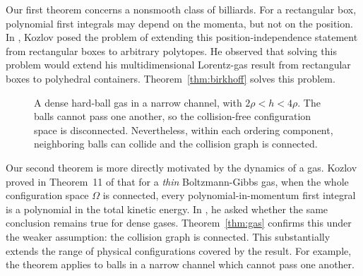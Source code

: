 \documentclass[12pt,reqno]{amsart}
\numberwithin{equation}{section}
\begin{document}
Our first theorem concerns a nonsmooth class of billiards. For a rectangular
box, polynomial first integrals may depend on
the momenta, but not on the position. In
\cite[\S9, item \(6^\circ\)]{Kozlov}, Kozlov posed the problem of extending
this position-independence statement from rectangular boxes to arbitrary
polytopes. He observed that solving this problem would extend his
multidimensional Lorentz-gas result from rectangular boxes to polyhedral
containers. Theorem~\ref{thm:birkhoff} solves this problem.
\begin{figure}[ht]
\centering
{}

\caption*{
A dense hard-ball gas in a narrow channel, with \(2\rho<h<4\rho\).
The balls cannot pass one another, so the collision-free configuration
space is disconnected. Nevertheless, within each ordering component,
neighboring balls can collide and the collision graph is connected.
}
\label{fig:dense-gas}
\end{figure}

Our second theorem is more directly motivated by the dynamics of a gas. Kozlov proved in Theorem~11 of \cite{Kozlov} that for a \emph{thin} Boltzmann-Gibbs gas, when the whole configuration space \(\Omega\) is connected, every polynomial-in-momentum first integral is a polynomial in the total kinetic
energy. In \cite[\S9, item \(1^\circ\)]{Kozlov}, he asked whether the same
conclusion remains true for dense 
gases. Theorem~\ref{thm:gas} confirms this under the weaker assumption: the collision graph is connected. This substantially extends the range of physical configurations covered by
the result. For example, the theorem applies to balls in a narrow channel which cannot pass one another. 
\end{document}
